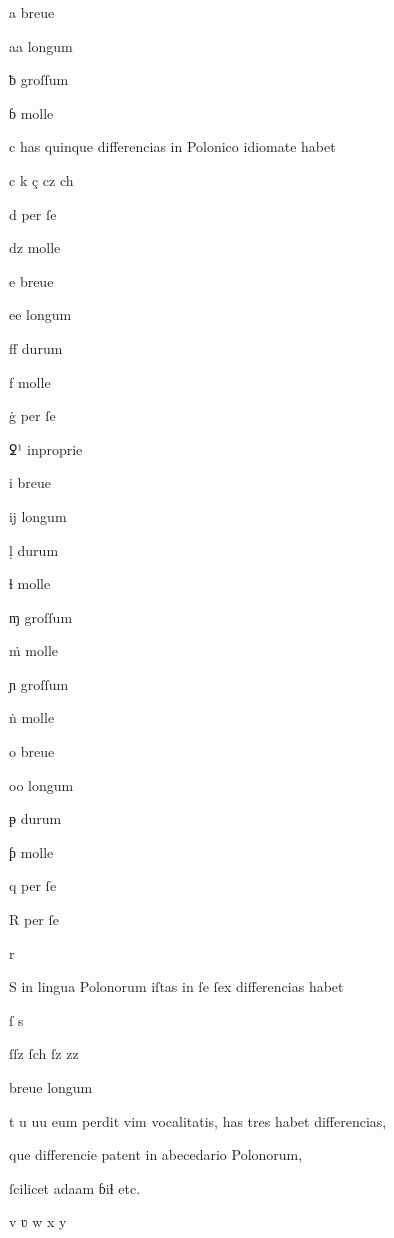 {%

\newpage

\fulllines



a breue 

aa longum 

ƀ groſſum 

ɓ molle

c has quinque differencias in Polonico idiomate habet

c k ç cz ch

d per ſe 

dz molle 

e breue 

ee longum 

ﬀ durum 

f molle




ġ per ſe 

ꝿ¹  inproprie 

i breue 

ĳ longum 

ḷ durum 

ɬ molle 



ɱ groſſum 

ṁ molle 

ɲ  groſſum 

ṅ   molle 

o breue    

oo longum



ᵽ durum 

ƥ molle 

q per ſe 

R per ſe 

r

S in lingua Polonorum iſtas in ſe ſex differencias habet        

ſ s 

ſſz ſch ſz zz

breue	longum

t u uu eum perdit vim vocalitatis, has tres habet differencias, 

que differencie patent in abecedario Polonorum, 

ſcilicet adaam ɓiɬ etc.   

v ʋ w	x y

}

